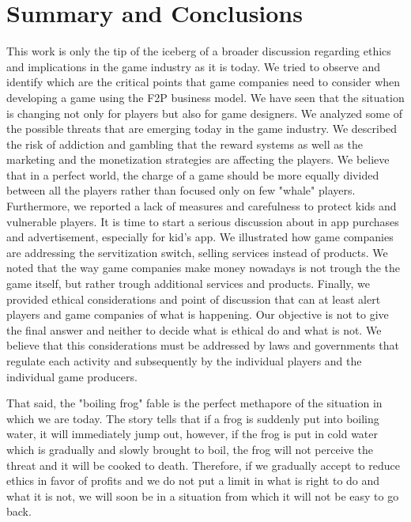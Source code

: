 \chapter{Summary and Conclusions}
\label{chap:conclusions}
This work is only the tip of the iceberg of a broader discussion regarding ethics and implications in the game industry as it is today. We tried to observe and identify which are the critical points that game companies need to consider when developing a game using the F2P business model. We have seen that the situation is changing not only for players but also for game designers. We analyzed some of the possible threats that are emerging today in the game industry. We described the risk of addiction and gambling that the reward systems as well as the marketing and the monetization strategies are affecting the players. We believe that in a perfect world, the charge of a game should be more equally divided between all the players rather than focused only on few "whale" players. Furthermore, we reported a lack of measures and carefulness to protect kids and vulnerable players. It is time to start a serious discussion about in app purchases and advertisement, especially for kid's app. We illustrated how game companies are addressing the servitization switch, selling services instead of products. We noted that the way game companies make money nowadays is not trough the the game itself, but rather trough additional services and products. Finally, we provided ethical considerations and point of discussion that can at least alert players and game companies of what is happening.
Our objective is not to give the final answer and neither to decide what is ethical do and what is not. We believe that this considerations must be addressed by laws and governments that regulate each activity and subsequently by the individual players and the individual game producers. 

That said, the "boiling frog" fable is the perfect methapore of the situation in which we are today. The story tells that if a frog is suddenly put into boiling water, it will immediately jump out, however, if the frog is put in cold water which is gradually and slowly brought to boil, the frog will not perceive the threat and it will be cooked to death. Therefore, if we gradually accept to reduce ethics in favor of profits and we do not put a limit in what is right to do and what it is not, we will soon be in a situation from which it will not be easy to go back.